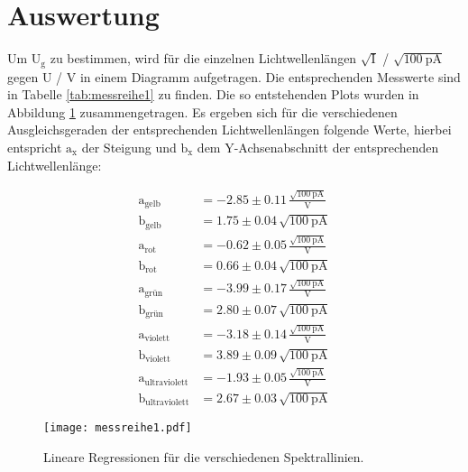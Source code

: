 \section{Auswertung}
\label{sec:Auswertung}
Um $\text{U}_\text{g}$ zu bestimmen, wird für die einzelnen Lichtwellenlängen $\sqrt{\text{I}}$ / $\sqrt{\SI{100}{\pico\ampere}}$ gegen $\text{U}$ / $\si{\volt}$ in einem Diagramm aufgetragen.
Die entsprechenden Messwerte sind in Tabelle \ref{tab:messreihe1} zu finden.
Die so entstehenden Plots wurden in Abbildung \ref{fig:messreihe1} zusammengetragen.
Es ergeben sich für die verschiedenen Ausgleichsgeraden der entsprechenden Lichtwellenlängen folgende Werte, hierbei entspricht $\text{a}_\text{x}$ der Steigung und $\text{b}_\text{x}$ dem Y-Achsenabschnitt der entsprechenden Lichtwellenlänge:

\begin{align*}
  \text{a}_\text{gelb} &= -2.85 \pm 0.11    \,\frac{\sqrt{\SI{100}{\pico\ampere}}}{\si{\volt}}   \\
  \text{b}_\text{gelb} &= 1.75 \pm 0.04     \,\sqrt{\SI{100}{\pico\ampere}}  \\
  \text{a}_\text{rot} &= -0.62 \pm 0.05    \,\frac{\sqrt{\SI{100}{\pico\ampere}}}{\si{\volt}}        \\
  \text{b}_\text{rot} &= 0.66 \pm 0.04       \,\sqrt{\SI{100}{\pico\ampere}}      \\
  \text{a}_\text{grün} &= -3.99 \pm 0.17    \,\frac{\sqrt{\SI{100}{\pico\ampere}}}{\si{\volt}}       \\
  \text{b}_\text{grün} &= 2.80 \pm 0.07        \,\sqrt{\SI{100}{\pico\ampere}}    \\
  \text{a}_\text{violett} &= -3.18 \pm 0.14     \,\frac{\sqrt{\SI{100}{\pico\ampere}}}{\si{\volt}}   \\
  \text{b}_\text{violett} &= 3.89 \pm 0.09       \,\sqrt{\SI{100}{\pico\ampere}}  \\
  \text{a}_\text{ultraviolett} &= -1.93 \pm 0.05   \,\frac{\sqrt{\SI{100}{\pico\ampere}}}{\si{\volt}}\\
  \text{b}_\text{ultraviolett} &= 2.67 \pm 0.03  \,\sqrt{\SI{100}{\pico\ampere}} 
\end{align*}

\FloatBarrier
\begin{figure}
  \centering
  \texttt{[image: messreihe1.pdf]}
  \caption{Lineare Regressionen für die verschiedenen Spektrallinien.}
  \label{fig:messreihe1}
\end{figure}
\FloatBarrier

